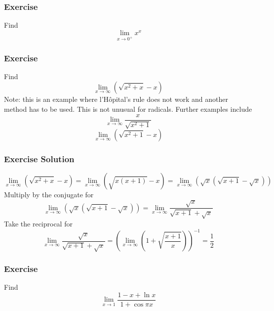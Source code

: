 \documentclass[xcolor=dvipsnames]{beamer}
\begin{document}
\begin{frame}
  \frametitle{Exercise}
  {\ubung} Find
  \begin{equation}
    \label{eq:mahpeilu}
    \lim_{x\rightarrow{}0^{+}}x^{x}
  \end{equation}
\end{frame}

\begin{frame}
  \frametitle{Exercise}
  {\ubung} Find
  \begin{equation}
    \label{eq:eigahrai}
    \lim_{x\rightarrow\infty}(\sqrt{x^{2}+x}-x)
  \end{equation}
  Note: this is an example where l'H{\^o}pital's rule does not work
  and another method has to be used. This is not unusual for radicals.
  Further examples include
  \begin{equation}
    \label{eq:pahxoquu}
    \lim_{x\rightarrow{}\infty}\frac{x}{\sqrt{x^{2}+1}}
  \end{equation}
  \begin{equation}
    \label{eq:roquaevi}
    \lim_{x\rightarrow\infty}(\sqrt{x^{2}+1}-x)
  \end{equation}
\end{frame}

\begin{frame}
  \frametitle{Exercise Solution}
  \begin{equation}
    \label{eq:erahdahv}
    \lim_{x\rightarrow\infty}(\sqrt{x^{2}+x}-x)=\lim_{x\rightarrow\infty}(\sqrt{x(x+1)}-x)=\lim_{x\rightarrow\infty}(\sqrt{x}(\sqrt{x+1}-\sqrt{x}))
  \end{equation}
  Multiply by the conjugate for
  \begin{equation}
    \label{eq:heetheer}
    \lim_{x\rightarrow\infty}(\sqrt{x}(\sqrt{x+1}-\sqrt{x}))=\lim_{x\rightarrow{}\infty}\frac{\sqrt{x}}{\sqrt{x+1}+\sqrt{x}}
  \end{equation}
  Take the reciprocal for
  \begin{equation}
    \label{eq:quahgoec}
    \lim_{x\rightarrow{}\infty}\frac{\sqrt{x}}{\sqrt{x+1}+\sqrt{x}}=\left(\lim_{x\rightarrow{}\infty}\left(1+\sqrt{\frac{x+1}{x}}\right)\right)^{-1}=\frac{1}{2}
  \end{equation}
\end{frame}

\begin{frame}
  \frametitle{Exercise}
  {\ubung} Find
  \begin{equation}
    \label{eq:vuciecha}
    \lim_{x\rightarrow{}1}\frac{1-x+\ln{}x}{1+\cos\pi{}x}
  \end{equation}
\end{frame}
\end{document}
